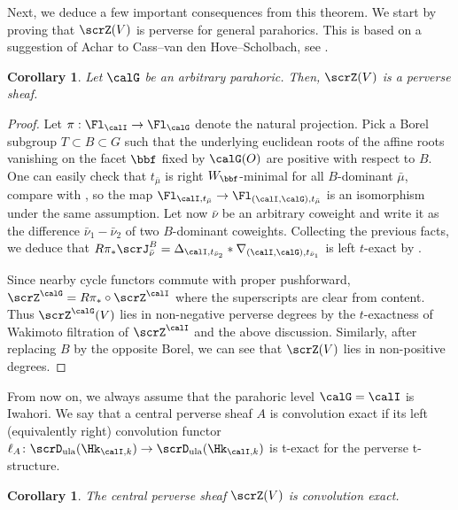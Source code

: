 \documentclass[10pt, reqno]{amsart}
\theoremstyle{plain}
\newtheorem{corollary}[theorem]{Corollary}
\theoremstyle{definition}
\numberwithin{equation}{section}
\begin{document}
	Next, we deduce a few important consequences from this theorem. We start by proving that $\scrZ(V)$ is perverse for general parahorics. This is based on a suggestion of Achar to Cass--van den Hove--Scholbach, see \cite[Theorem 5.30]{CvdHS24}.
	
	\begin{corollary}
		Let $\calG$ be an arbitrary parahoric. Then, $\scrZ(V)$ is a perverse sheaf.
	\end{corollary}
	
	\begin{proof}
		Let $\pi:\Fl_\calI\rightarrow\Fl_\calG$ denote the natural projection. Pick a Borel subgroup $T\subset B\subset G$ such that the underlying euclidean roots of the affine roots vanishing on the facet $\bbf$ fixed by $\calG(O)$ are positive with respect to $B$. One can easily check that $t_{\bar \mu}$ is right $W_\bbf$-minimal for all $B$-dominant $\bar \mu$, compare with \cite[Lemma 5.28]{CvdHS24}, so the map $\Fl_{ \calI,t_{\bar \mu}}\to \Fl_{(\calI,\calG),t_{\bar \mu}}$ is an isomorphism under the same assumption. Let now $\bar \nu$ be an arbitrary coweight and write it as the difference $\bar\nu_1-\bar\nu_2$ of two $B$-dominant coweights. Collecting the previous facts, we deduce that $R\pi_* \scrJ^B_{\bar{\nu}}=\Delta_{\calI,t_{\bar \nu_2}} \ast \nabla_{(\calI,\calG),t_{\bar \nu_1}}$ is left $t$-exact by .
		
		Since nearby cycle functors commute with proper pushforward, $\scrZ^\calG=R\pi_*\circ \scrZ^\calI$ where the superscripts are clear from content. Thus $\scrZ^\calG(V)$ lies in non-negative perverse degrees by the $t$-exactness of Wakimoto filtration of $\scrZ^\calI$ and the above discussion. Similarly, after replacing $B$ by the opposite Borel, we can see that $\scrZ(V)$ lies in non-positive degrees.
	\end{proof}
	
	From now on, we always assume that the parahoric level $\calG=\calI$ is Iwahori. We say that a central perverse sheaf $A$ is convolution exact if its left (equivalently right) convolution functor $\ell_A \colon \scrD_{\mathrm{ula}}(\Hk_{\calI,k}) \to \scrD_{\mathrm{ula}}(\Hk_{\calI,k})  $ is t-exact for the perverse t-structure.
	
	\begin{corollary}\label{cor_Z_conv_exact}
		The central perverse sheaf $\scrZ(V)$ is convolution exact.
	\end{corollary}
	
\end{document}
